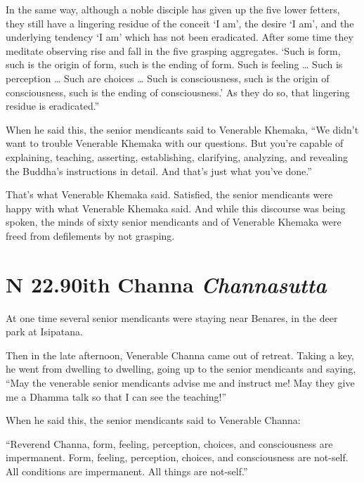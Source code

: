 \documentclass[12pt,openany]{book}%
\newcommand*{\suttatitleacronym}[1]{\smaller[2]{#1}\vspace*{.3em}}
\newcommand*{\suttatitletranslation}[1]{\linebreak{#1}}
\newcommand*{\suttatitleroot}[1]{\linebreak\smaller[2]\itshape{#1}}
\newcommand*{\tocacronym}[1]{\hspace*{-3.3em}{#1}\quad}
\newcommand*{\toctranslation}[1]{#1}
\newcommand*{\tocroot}[1]{(\textit{#1})}
\begin{document}
In the same way, although a noble disciple has given up the five lower fetters, they still have a lingering residue of the conceit ‘I am’, the desire ‘I am’, and the underlying tendency ‘I am’ which has not been eradicated. After some time they meditate observing rise and fall in the five grasping aggregates. ‘Such is form, such is the origin of form, such is the ending of form. Such is feeling … Such is perception … Such are choices … Such is consciousness, such is the origin of consciousness, such is the ending of consciousness.’ As they do so, that lingering residue is eradicated.” 

When he said this, the senior mendicants said to Venerable Khemaka, “We didn’t want to trouble Venerable Khemaka with our questions. But you’re capable of explaining, teaching, asserting, establishing, clarifying, analyzing, and revealing the Buddha’s instructions in detail. And that’s just what you’ve done.” 

That’s what Venerable Khemaka said. Satisfied, the senior mendicants were happy with what Venerable Khemaka said. And while this discourse was being spoken, the minds of sixty senior mendicants and of Venerable Khemaka were freed from defilements by not grasping. 

%
\section*{{\suttatitleacronym SN 22.90}{\suttatitletranslation With Channa }{\suttatitleroot Channasutta}}
\addcontentsline{toc}{section}{\tocacronym{SN 22.90} \toctranslation{With Channa } \tocroot{Channasutta}}

At one time several senior mendicants were staying near Benares, in the deer park at Isipatana. 

Then in the late afternoon, Venerable Channa came out of retreat. Taking a key, he went from dwelling to dwelling, going up to the senior mendicants and saying, “May the venerable senior mendicants advise me and instruct me! May they give me a Dhamma talk so that I can see the teaching!” 

When he said this, the senior mendicants said to Venerable Channa: 

“Reverend Channa, form, feeling, perception, choices, and consciousness are impermanent. Form, feeling, perception, choices, and consciousness are not-self. All conditions are impermanent. All things are not-self.” 
\end{document}
